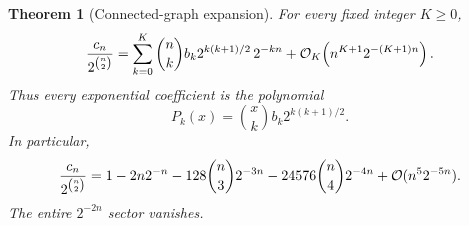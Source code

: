 \documentclass[11pt,openany]{book}
\numberwithin{equation}{chapter}
\theoremstyle{plain}
\newtheorem{theorem}{Theorem}[chapter]
\theoremstyle{definition}
\theoremstyle{remark}
\begin{document}
\begin{theorem}[Connected-graph expansion]
\label{t2:thm:graphs}
For every fixed integer $K\ge0$,
\begin{equation}
 \frac{c_n}{2^{\binom n2}}
 =\sum_{k=0}^{K}\binom nk b_k
       2^{k(k+1)/2}\,2^{-kn}
  +\mathcal O_K\!\left(n^{K+1}2^{-(K+1)n}\right).
 \label{t2:eq:graph-expansion}
\end{equation}
Thus every exponential coefficient is the polynomial
\begin{equation}
 P_k(x)=\binom xk b_k2^{k(k+1)/2}.
 \label{t2:eq:graph-P}
\end{equation}
In particular,
\begin{equation}
 \frac{c_n}{2^{\binom n2}}
 =1-2n2^{-n}-128\binom n3 2^{-3n}
       -24576\binom n4 2^{-4n}
       +\mathcal O(n^5 2^{-5n}).
 \label{t2:eq:graph-first}
\end{equation}
The entire $2^{-2n}$ sector vanishes.
\end{theorem}
\end{document}

